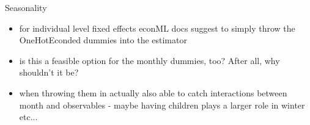 \documentclass[a4paper, 12pt]{beamer}
\begin{document}
\begin{frame}{Seasonality}
\begin{itemize}
    \item for individual level fixed effects econML docs suggest to simply throw the OneHotEconded dummies into the estimator 
    \item is this a feasible option for the monthly dummies, too? After all, why shouldn't it be?
    \item when throwing them in actually also able to catch interactions between month and observables - maybe having children plays a larger role in winter etc...
\end{itemize}
\end{frame}
\end{document}
